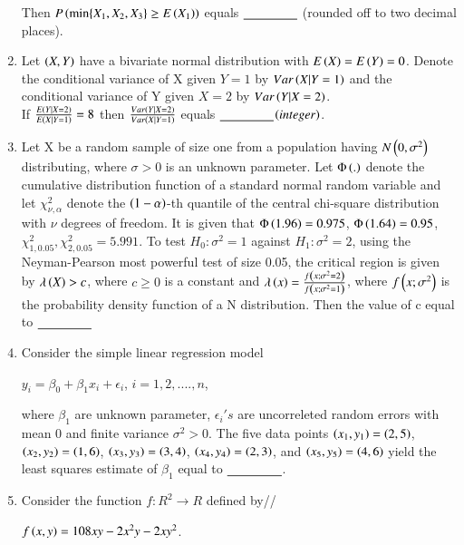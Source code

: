 \documentclass[journal,12pt,onecolumn]{IEEEtran}
\theoremstyle{remark}
\begin{document}
\begin{enumerate}
    Then $ P\brak{ \min\{X_1, X_2, X_3\} \geq E\brak{X_1}} $ equals  $\underline{\hspace{1.5 cm}}$ (rounded off to two decimal places).
\item Let $\brak{X, Y}$ have a bivariate normal distribution with $E\brak{X}=E\brak{Y}=0$. Denote the conditional variance of X given $Y=1$ by $Var\brak{X|Y=1}$ and the conditional variance of Y given $X=2$ by $Var\brak{Y|X=2}$.\\
If $\frac{E\brak{Y|X=2}}{E\brak{X|Y=1}}=8$ then $\frac{Var\brak{Y|X=2}}{Var\brak{X|Y=1}}$ equals $\underline{\hspace{1.5 cm}}$$\brak{integer}$.
\item Let X be a random sample of size one from a population having $N\brak{0,\sigma^2}$ distributing, where $\sigma>0$ is an unknown parameter. Let $\Phi\brak{.}$ denote the cumulative distribution function of a standard normal random variable and let  $\chi^2 _{\nu,\alpha}$ denote the $\brak{1-\alpha}$-th quantile of the central chi-square distribution with $\nu$ degrees of freedom. It is given that $\Phi\brak{1.96}=0.975$, $\Phi\brak{1.64}=0.95$,$\chi^2 _{1,0.05},\chi^2 _ {2,0.05}=5.991.$ To test $H_0:\sigma^2=1$ against $H_1:\sigma^2=2$, using the Neyman-Pearson most powerful test of size 0.05, the critical region is given by $\lambda\brak{X}>c$, where $c\geq0$ is a constant and $\lambda\brak{x}=\frac{f\brak{x;\sigma^2=2}}{f\brak{x;\sigma^2 =1}}$, where $f\brak{x;\sigma^2}$ is the probability density function of a N distribution. Then the value of c equal to $\underline{\hspace{1.5 cm}}$
\item Consider the simple linear regression model 
\begin{center}
    $y_i = {\beta}_0 + {\beta}_1 x_i + {\epsilon}_i$, $i=1,2,....,n$, 
\end{center}
where ${\beta}_1$ are unknown parameter, $\epsilon_i 's$ are uncorreleted random errors with mean 0 and finite variance $\sigma^2 > 0$. The five data points $\brak{x_1,y_1}=\brak{2,5}$, $\brak{x_2,y_2}=\brak{1,6}$, $\brak{x_3,y_3}=\brak{3,4}$, $\brak{x_4,y_4}=\brak{2,3}$, and $\brak{x_5,y_5}=\brak{4,6}$ yield the least squares estimate of $\beta_1$ equal to $\underline{\hspace{1.5 cm}}$.
\item Consider the function $f:R^2 \rightarrow R$ defined by//
\begin{center}
$f\brak{x,y}=108xy-2x^2 y - 2xy^2$.
\end{center}
$$
\end{enumerate}
\end{document}
